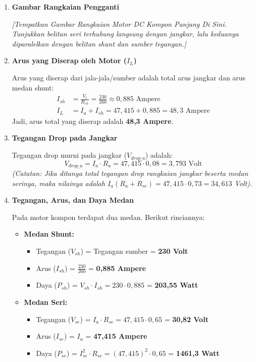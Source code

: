 \documentclass[12pt, a4paper]{article}
\begin{document}
\begin{enumerate}[label=\alph*.]
    \item \textbf{Gambar Rangkaian Pengganti}

    \textit{[Tempatkan Gambar Rangkaian Motor DC Kompon Panjang Di Sini. Tunjukkan belitan seri terhubung langsung dengan jangkar, lalu keduanya diparalelkan dengan belitan shunt dan sumber tegangan.]}

    \item \textbf{Arus yang Diserap oleh Motor ($I_L$)}

    Arus yang diserap dari jala-jala/sumber adalah total arus jangkar dan arus medan shunt:
    \begin{align*}
        I_{sh} &= \frac{V_t}{R_{sh}} = \frac{230}{260} \approx 0,885 \text{ Ampere} \\
        I_L &= I_a + I_{sh} = 47,415 + 0,885 = 48,3 \text{ Ampere}
    \end{align*}
    Jadi, arus total yang diserap adalah \textbf{48,3 Ampere}.

    \item \textbf{Tegangan Drop pada Jangkar}

    Tegangan drop murni pada jangkar ($V_{drop\_a}$) adalah:
    \[
        V_{drop\_a} = I_a \cdot R_a = 47,415 \cdot 0,08 = 3,793 \text{ Volt}
    \]
    \textit{(Catatan: Jika ditanya total tegangan drop rangkaian jangkar beserta medan serinya, maka nilainya adalah $I_a(R_a + R_{se}) = 47,415 \cdot 0,73 = 34,613$ Volt).}

    \item \textbf{Tegangan, Arus, dan Daya Medan}

    Pada motor kompon terdapat dua medan. Berikut rinciannya:
    \begin{itemize}
        \item \textbf{Medan Shunt:}
        \begin{itemize}
            \item Tegangan ($V_{sh}$) = Tegangan sumber = \textbf{230 Volt}
            \item Arus ($I_{sh}$) = $\frac{230}{260}$ = \textbf{0,885 Ampere}
            \item Daya ($P_{sh}$) = $V_{sh} \cdot I_{sh} = 230 \cdot 0,885$ = \textbf{203,55 Watt}
        \end{itemize}
        \item \textbf{Medan Seri:}
        \begin{itemize}
            \item Tegangan ($V_{se}$) = $I_a \cdot R_{se} = 47,415 \cdot 0,65$ = \textbf{30,82 Volt}
            \item Arus ($I_{se}$) = $I_a$ = \textbf{47,415 Ampere}
            \item Daya ($P_{se}$) = $I_{se}^2 \cdot R_{se} = (47,415)^2 \cdot 0,65$ = \textbf{1461,3 Watt}
        \end{itemize}
    \end{itemize}


\end{enumerate}
\end{document}
